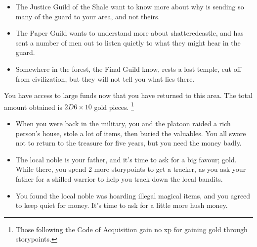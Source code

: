 \begin{multicols}{2}
{  \begin{itemize}

    \item
    The Justice Guild of the Shale want to know more about why  is sending so many of the \gls{guard} to your area, and not theirs.
    \item
    The Paper Guild wants to understand more about \gls{shatteredcastle}, and has sent a number of men out to listen quietly to what they might hear in the guard.
    \item
    Somewhere in the forest, the Final Guild know, rests a lost temple, cut off from civilization, but they will not tell you what lies there.

  \end{itemize}
}
{
  You have access to large funds now that you have returned to this area.
  The total amount obtained is $2D6 \times 10$ gold pieces.%
  \footnote{Those following the Code of Acquisition gain no \gls{xp} for gaining gold through \glspl{storypoint}.}

    \begin{itemize}
    \item When you were back in the military, you and the platoon raided a rich person's house, stole a lot of items, then buried the valuables.
    You all swore not to return to the treasure for five years, but you need the money badly.
    \item The local noble is your father, and it's time to ask for a big favour; gold.
    While there, you spend 2 more \glspl{storypoint} to get a tracker, as you ask your father for a skilled warrior to help you track down the local bandits.
    \item You found the local noble was hoarding illegal magical items, and you agreed to keep quiet for money.
    It's time to ask for a little more hush money.
    \end{itemize}
}

\end{multicols}

